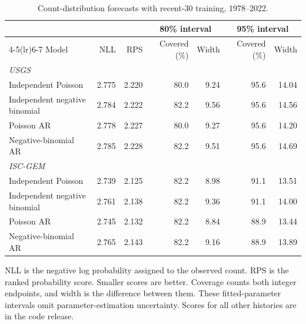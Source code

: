 \begin{table}[!htb]
\centering
\small
\caption{Count-distribution forecasts with recent-30 training, 1978--2022.}
\label{tab:count}
\setlength{\tabcolsep}{4pt}
\begin{tabular}{lrrrrrr}
\toprule
 & & & \multicolumn{2}{c}{80\% interval} & \multicolumn{2}{c}{95\% interval} \\
\cmidrule(lr){4-5}\cmidrule(lr){6-7}
Model & NLL & RPS & Covered (\%) & Width & Covered (\%) & Width \\
\midrule
\multicolumn{7}{l}{\textit{USGS}} \\
Independent Poisson & 2.775 & 2.220 & 80.0 & 9.24 & 95.6 & 14.04 \\
Independent negative binomial & 2.784 & 2.222 & 82.2 & 9.56 & 95.6 & 14.56 \\
Poisson AR & 2.778 & 2.227 & 80.0 & 9.27 & 95.6 & 14.20 \\
Negative-binomial AR & 2.785 & 2.228 & 82.2 & 9.51 & 95.6 & 14.69 \\
\multicolumn{7}{l}{\textit{ISC-GEM}} \\
Independent Poisson & 2.739 & 2.125 & 82.2 & 8.98 & 91.1 & 13.51 \\
Independent negative binomial & 2.761 & 2.138 & 82.2 & 9.36 & 91.1 & 14.00 \\
Poisson AR & 2.745 & 2.132 & 82.2 & 8.84 & 88.9 & 13.44 \\
Negative-binomial AR & 2.765 & 2.143 & 82.2 & 9.16 & 88.9 & 13.89 \\
\bottomrule
\end{tabular}
\par\smallskip
\begin{minipage}{\linewidth}\footnotesize
NLL is the negative log probability assigned to the observed count. RPS is the ranked probability score. Smaller scores are better. Coverage counts both integer endpoints, and width is the difference between them. These fitted-parameter intervals omit parameter-estimation uncertainty. Scores for all other histories are in the code release.
\end{minipage}
\end{table}
